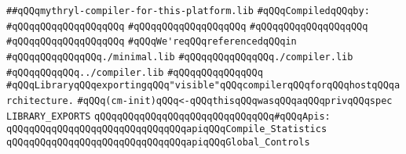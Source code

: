 \label{src/lib/core/compiler/mythryl-compiler-for-this-platform.lib}
\verb|##qQQqmythryl-compiler-for-this-platform.lib|\newline
\newline
\verb|#qQQqCompiledqQQqby:|\newline
\verb|#qQQqqQQqqQQqqQQqqQQq|\newline
\verb|#qQQqqQQqqQQqqQQqqQQq|\newline
\verb|#qQQqqQQqqQQqqQQqqQQq|\newline
\verb|#qQQqqQQqqQQqqQQqqQQq|\newline
\newline
\verb|#qQQqWe'reqQQqreferencedqQQqin|\newline
\verb|#qQQqqQQqqQQqqQQq./minimal.lib|\newline
\verb|#qQQqqQQqqQQqqQQq./compiler.lib|\newline
\verb|#qQQqqQQqqQQq../compiler.lib|\newline
\verb|#qQQqqQQqqQQqqQQq|\newline
\newline
\newline
\newline
\verb|#qQQqLibraryqQQqexportingqQQq"visible"qQQqcompilerqQQqforqQQqhostqQQqarchitecture.|\newline
\newline
\newline
\newline
\newline
\verb|#qQQq(cm-init)qQQq<-qQQqthisqQQqwasqQQqaqQQqprivqQQqspec|\newline
\newline
\verb|LIBRARY_EXPORTS|\newline
\newline
\verb|qQQqqQQqqQQqqQQqqQQqqQQqqQQqqQQq#qQQqApis:|\newline
\verb|qQQqqQQqqQQqqQQqqQQqqQQqqQQqqQQqapiqQQqCompile_Statistics|\newline
\verb|qQQqqQQqqQQqqQQqqQQqqQQqqQQqqQQqapiqQQqGlobal_Controls|\newline

